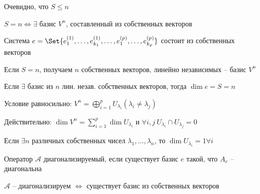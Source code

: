 \documentclass[12pt]{article}
\begin{document}
    Очевидно, что $S \leq n$

    \begin{MyTheorem}
        \Ths $S = n \Longleftrightarrow \exists$ базис $V^n$, составленный из собственных векторов
    \end{MyTheorem}

    \begin{MyProof}
        Система $e = \Set{e^{(1)}_1, \dots, e^{(1)}_{k_1}, \dots, e^{(p)}_1, \dots, e^{(p)}_{k_p}}$ состоит из собственных векторов

        Если $S = n$, получаем $n$ собственных векторов, линейно независимых -- базис $V^n$

        Если $\exists$ базис из $n$ лин. незав. собственных векторов, тогда $\dim e = S = n$
    \end{MyProof}

    \Nota Условие \Ths равносильно: $V^n = \bigoplus_{i=1}^p U_{\lambda_i} (\lambda_i \neq \lambda_j)$

    Действительно: $\dim V^n = \sum_{i=1}^p \dim U_{\lambda_i}$ и $\forall i, j \ U_{\lambda_i} \cap U_{\lambda_j} = 0$

    \Ex Если $\exists n$ различных собственных чисел $\lambda_1, \dots, \lambda_n$, то $\dim U_{\lambda_i} = 1 \forall i$

    \Def Оператор $\mathcal{A}$ диагонализируемый, если существует базис $e$ такой, что $A_e$ -- диагональна

    \hypertarget{diagonalizedmatrixtheorem}{}

    \begin{MyTheorem}
        \Ths $\mathcal{A}$ -- диагонализируем $\Longleftrightarrow$ существует базис из собственных векторов
    \end{MyTheorem}
\end{document}
